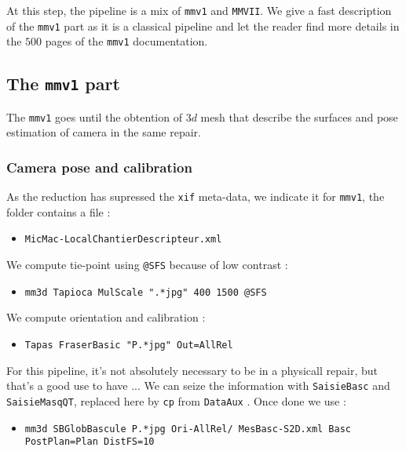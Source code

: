 At this step, the pipeline is a mix of {\tt mmv1} and {\tt MMVII}. We give a fast description
of the {\tt mmv1} part as it is a classical pipeline and let the reader find more details
in the $500$ pages of the  {\tt mmv1} documentation.



\subsection{The  {\tt mmv1} part}

The  {\tt mmv1} goes until the obtention of $3d$ mesh that describe the surfaces and
pose estimation of camera in the same repair.


\subsubsection{Camera pose and calibration}

As the reduction has supressed the {\tt xif} meta-data, we indicate it
for {\tt mmv1}, the folder contains a file :

\begin{itemize}
    \item {\tt MicMac-LocalChantierDescripteur.xml}
\end{itemize}

We compute tie-point using {\tt @SFS} because of low contrast :

\begin{itemize}
    \item {\tt mm3d Tapioca MulScale ".*jpg" 400 1500 @SFS}
\end{itemize}

We compute orientation and calibration : 

\begin{itemize}
   \item {\tt Tapas FraserBasic "P.*jpg" Out=AllRel}
\end{itemize}

For  this pipeline, it's not absolutely necessary to be in a physicall repair,
but that's a good use to have ... We can seize the information with
{\tt SaisieBasc} and {\tt SaisieMasqQT}, replaced here by {\tt cp} from {\tt DataAux} . 
Once done we use :

\begin{itemize}
    \item {\tt mm3d SBGlobBascule P.*jpg Ori-AllRel/ MesBasc-S2D.xml Basc  PostPlan=Plan DistFS=10}
\end{itemize}

